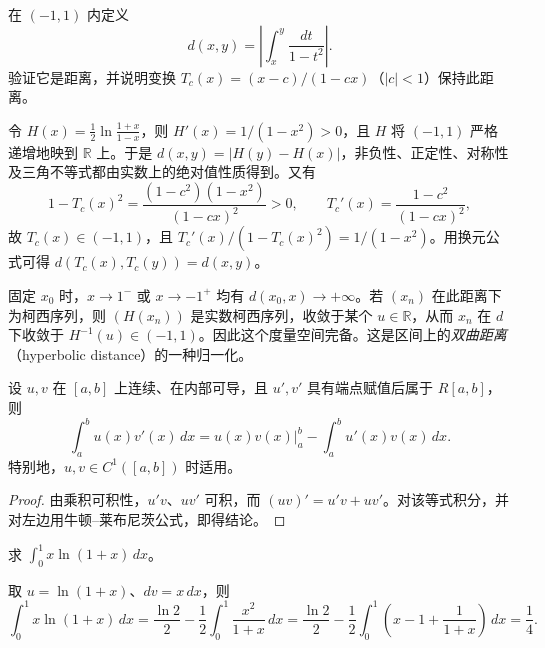 \begin{example}
\label{ex:hyperbolic-distance-on-interval}
在 $(-1,1)$ 内定义
\[
    d(x,y)=\left|\int_x^y\frac{dt}{1-t^2}\right|.
\]
验证它是距离，并说明变换 $T_c(x)=(x-c)/(1-cx)$（$|c|<1$）保持此距离。
\end{example}
\begin{solve}
令 $H(x)=\frac12\ln\frac{1+x}{1-x}$，则 $H'(x)=1/(1-x^2)>0$，且 $H$ 将 $(-1,1)$ 严格递增地映到 $\mathbb R$ 上。于是 $d(x,y)=|H(y)-H(x)|$，非负性、正定性、对称性及三角不等式都由实数上的绝对值性质得到。又有
\[
    1-T_c(x)^2=\frac{(1-c^2)(1-x^2)}{(1-cx)^2}>0,\qquad
    T_c'(x)=\frac{1-c^2}{(1-cx)^2},
\]
故 $T_c(x)\in(-1,1)$，且 $T_c'(x)/(1-T_c(x)^2)=1/(1-x^2)$。用换元公式可得 $d(T_c(x),T_c(y))=d(x,y)$。

固定 $x_0$ 时，$x\to1^-$ 或 $x\to-1^+$ 均有 $d(x_0,x)\to+\infty$。若 $(x_n)$ 在此距离下为柯西序列，则 $(H(x_n))$ 是实数柯西序列，收敛于某个 $u\in\mathbb R$，从而 $x_n$ 在 $d$ 下收敛于 $H^{-1}(u)\in(-1,1)$。因此这个度量空间完备。这是区间上的\emph{双曲距离}（hyperbolic distance）的一种归一化。
\end{solve}

\begin{theorem}[定积分分部积分公式]
\label{thm:definite-integration-by-parts}
设 $u,v$ 在 $[a,b]$ 上连续、在内部可导，且 $u',v'$ 具有端点赋值后属于 $R[a,b]$，则
\begin{equation}
    \int_a^b u(x)v'(x)\,dx
    =\left.u(x)v(x)\right|_a^b-\int_a^b u'(x)v(x)\,dx.
    \label{eq:definite-integration-by-parts}
\end{equation}
特别地，$u,v\in C^1([a,b])$ 时适用。
\end{theorem}
\begin{proof}
由乘积可积性，$u'v$、$uv'$ 可积，而 $(uv)'=u'v+uv'$。对该等式积分，并对左边用牛顿--莱布尼茨公式，即得结论。
\end{proof}

\begin{example}
\label{ex:integration-by-parts-logarithm}
求 $\displaystyle\int_0^1x\ln(1+x)\,dx$。
\end{example}
\begin{solve}
取 $u=\ln(1+x)$、$dv=x\,dx$，则
\[
    \int_0^1x\ln(1+x)\,dx
    =\frac{\ln2}{2}-\frac12\int_0^1\frac{x^2}{1+x}\,dx
    =\frac{\ln2}{2}-\frac12\int_0^1\left(x-1+\frac1{1+x}\right)\,dx
    =\frac14.
\]
\end{solve}

